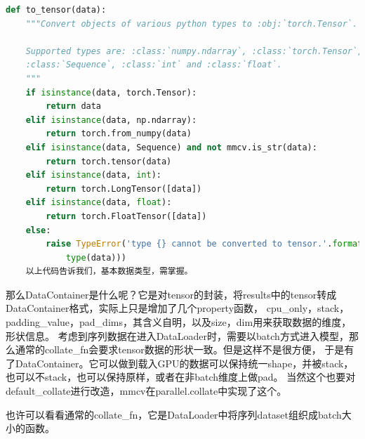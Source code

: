 \documentclass[UTF8]{ctexart}
\begin{document}
\lstset{style=mystyle}
\begin{lstlisting}[language=Python]
def to_tensor(data):
    """Convert objects of various python types to :obj:`torch.Tensor`.

    Supported types are: :class:`numpy.ndarray`, :class:`torch.Tensor`,
    :class:`Sequence`, :class:`int` and :class:`float`.
    """
    if isinstance(data, torch.Tensor):
        return data
    elif isinstance(data, np.ndarray):
        return torch.from_numpy(data)
    elif isinstance(data, Sequence) and not mmcv.is_str(data):
        return torch.tensor(data)
    elif isinstance(data, int):
        return torch.LongTensor([data])
    elif isinstance(data, float):
        return torch.FloatTensor([data])
    else:
        raise TypeError('type {} cannot be converted to tensor.'.format(
			type(data)))
	以上代码告诉我们，基本数据类型，需掌握。
\end{lstlisting}

那么DataContainer是什么呢？它是对tensor的封装，将results中的tensor转成DataContainer格式，实际上只是增加了几个property函数，
cpu\_only，stack，padding\_value，pad\_dims，其含义自明，以及size，dim用来获取数据的维度，形状信息。
考虑到序列数据在进入DataLoader时，需要以batch方式进入模型，那么通常的collate\_fn会要求tensor数据的形状一致。但是这样不是很方便，
于是有了DataContainer。它可以做到载入GPU的数据可以保持统一shape，并被stack，也可以不stack，也可以保持原样，或者在非batch维度上做pad。
当然这个也要对default\_collate进行改造，mmcv在parallel.collate中实现了这个。

也许可以看看通常的collate\_fn，它是DataLoader中将序列dataset组织成batch大小的函数。
\end{document}
